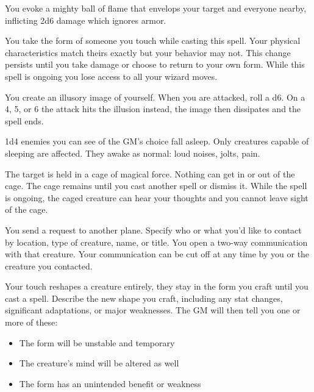  You evoke a mighty ball of flame that envelops your target and everyone nearby, inflicting 2d6 damage which ignores armor.





 You take the form of someone you touch while casting this spell. Your physical characteristics match theirs exactly but your behavior may not. This change persists until you take damage or choose to return to your own form. While this spell is ongoing you lose access to all your wizard moves.





 You create an illusory image of yourself. When you are attacked, roll a d6. On a 4, 5, or 6 the attack hits the illusion instead, the image then dissipates and the spell ends.





 1d4 enemies you can see of the GM's choice fall asleep. Only creatures capable of sleeping are affected. They awake as normal: loud noises, jolts, pain.





 The target is held in a cage of magical force. Nothing can get in or out of the cage. The cage remains until you cast another spell or dismiss it. While the spell is ongoing, the caged creature can hear your thoughts and you cannot leave sight of the cage.





 You send a request to another plane. Specify who or what you'd like to contact by location, type of creature, name, or title. You open a two-way communication with that creature. Your communication can be cut off at any time by you or the creature you contacted.





 Your touch reshapes a creature entirely, they stay in the form you craft until you cast a spell. Describe the new shape you craft, including any stat changes, significant adaptations, or major weaknesses. The GM will then tell you one or more of these:
\begin{itemize}
\item The form will be unstable and temporary
\item The creature's mind will be altered as well
\item The form has an unintended benefit or weakness

\end{itemize}

